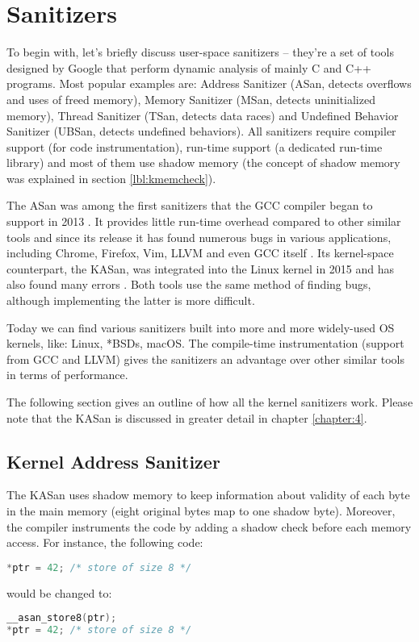 \documentclass[shortabstract, manyadvisors, english, mgr]{iithesis}
\theoremstyle{definition} \newtheorem*{definition}{Definicja}
\theoremstyle{definition} \newtheorem*{example}{Przykład}
\theoremstyle{definition} \newtheorem*{remark}{Uwaga}
\begin{document}
\section{Sanitizers}
\label{section:3-sanitizers}
To begin with, let's briefly discuss user-space sanitizers -- they're a set of tools designed by Google that perform dynamic analysis of mainly C and C++ programs. Most popular examples are: Address Sanitizer (ASan, detects overflows and uses of freed memory), Memory Sanitizer (MSan, detects uninitialized memory), Thread Sanitizer (TSan, detects data races) and Undefined Behavior Sanitizer (UBSan, detects undefined behaviors). All sanitizers require compiler support (for code instrumentation), run-time support (a dedicated run-time library) and most of them use shadow memory (the concept of shadow memory was explained in section \ref{lbl:kmemcheck}).

The ASan was among the first sanitizers that the GCC compiler began to support in 2013 \cite{bib:gcc-4.8-changes}. It provides little run-time overhead compared to other similar tools \cite{bib:asan-paper} and since its release it has found numerous bugs in various applications, including Chrome, Firefox, Vim, LLVM and even GCC itself \cite{bib:asan-found-bugs}. Its kernel-space counterpart, the KASan, was integrated into the Linux kernel in 2015 \cite{bib:linux-kasan} and has also found many errors \cite{bib:linux-kasan-found}. Both tools use the same method of finding bugs, although implementing the latter is more difficult.

Today we can find various sanitizers built into more and more widely-used OS kernels, like: Linux, *BSDs, macOS. The compile-time instrumentation (support from GCC and LLVM) gives the sanitizers an advantage over other similar tools in terms of performance.

The following section gives an outline of how all the kernel sanitizers work. Please note that the KASan is discussed in greater detail in chapter \ref{chapter:4}.

\subsection{Kernel Address Sanitizer}
The KASan uses shadow memory to keep information about validity of each byte in the main memory (eight original bytes map to one shadow byte). Moreover, the compiler instruments the code by adding a shadow check before each memory access.
For instance, the following code:
\begin{lstlisting}[language=C]
*ptr = 42; /* store of size 8 */
\end{lstlisting}
would be changed to:
\begin{lstlisting}[language=C]
__asan_store8(ptr);
*ptr = 42; /* store of size 8 */
\end{lstlisting}
\end{document}
